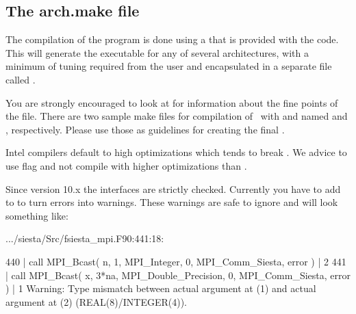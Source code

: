 \subsection{The arch.make file}
\label{sec:arch-make}

The compilation of the program is done using a  that is
provided with the code. This  will
generate the executable for any of several architectures, with a
minimum of tuning required from the user and encapsulated in a
separate file called .

You are strongly encouraged to look at
 for information about the
fine points of the  file. There are two sample make
files for compilation of \siesta\ with  and
 named  and
, respectively. Please use those as guidelines
for creating the final .

\note Intel compilers default to high optimizations which tends to
break \siesta. We advice to use  flag and not
compile with higher optimizations than .

\note Since  version 10.x the interfaces are strictly
checked. Currently you have to add 
to  to turn errors into warnings. These warnings are
safe to ignore and will look something like:
\begin{shellexample}[xleftmargin=1ex,fontsize=\footnotesize]
  .../siesta/Src/fsiesta_mpi.F90:441:18:

  440 |   call MPI_Bcast( n, 1, MPI_Integer, 0, MPI_Comm_Siesta, error )
      |                  2
  441 |   call MPI_Bcast( x, 3*na, MPI_Double_Precision, 0, MPI_Comm_Siesta, error )
      |                  1
Warning: Type mismatch between actual argument at (1) and actual argument at (2) (REAL(8)/INTEGER(4)).
\end{shellexample}

  


